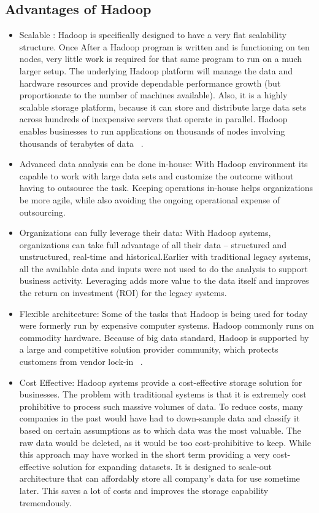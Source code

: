 \subsection{Advantages of Hadoop}
\begin{itemize}

\item Scalable : 
Hadoop is specifically designed to have a very flat scalability structure. 
Once After a Hadoop program is written and is functioning on ten nodes, very 
little work is required for that same program to run on a much larger setup. 
The underlying Hadoop platform will manage the data and hardware resources and 
provide dependable performance growth (but proportionate to the number of 
machines available). Also, it is a highly scalable storage platform, because it 
can store and distribute large data sets across hundreds of inexpensive servers 
that operate in parallel. Hadoop enables businesses to run applications on 
thousands of nodes involving thousands of terabytes of data
~\cite{hid-sp18-406-hadoop-intro8}.

\item Advanced data analysis can be done in-house: 
With Hadoop environment its capable to work with large data sets and customize 
the outcome without having to outsource the task. Keeping operations in-house 
helps organizations be more agile, while also avoiding the ongoing operational 
expense of outsourcing.

\item Organizations can fully leverage their data: 
With Hadoop systems, organizations can take full advantage of all their data – 
structured and unstructured, real-time and historical.Earlier with traditional 
legacy systems, all the available data and inputs were not used to do the 
analysis to support business activity. Leveraging adds more value to the data 
itself and improves the return on investment (ROI) for the legacy systems.

\item Flexible architecture: 
Some of the tasks that Hadoop is being used for today were formerly run by 
expensive computer systems. Hadoop commonly runs on commodity hardware. Because 
of big data standard, Hadoop is supported by a large and competitive solution 
provider community, which protects customers from vendor lock-in
~\cite{hid-sp18-406-hadoop-intro9}.

\item Cost Effective: 
Hadoop systems provide a cost-effective storage solution for businesses. The 
problem with traditional systems is that it is extremely cost prohibitive to 
process such massive volumes of data. To reduce costs, many companies in the 
past would have had to down-sample data and classify it based on certain 
assumptions as to which data was the most valuable. The raw data would be 
deleted, as it would be too cost-prohibitive to keep. While this approach may 
have worked in the short term providing a very cost-effective solution for 
expanding datasets. It is designed to scale-out architecture that can affordably
store all company's data for use sometime later. This saves a lot of costs and 
improves the storage capability tremendously.


\end{itemize}

